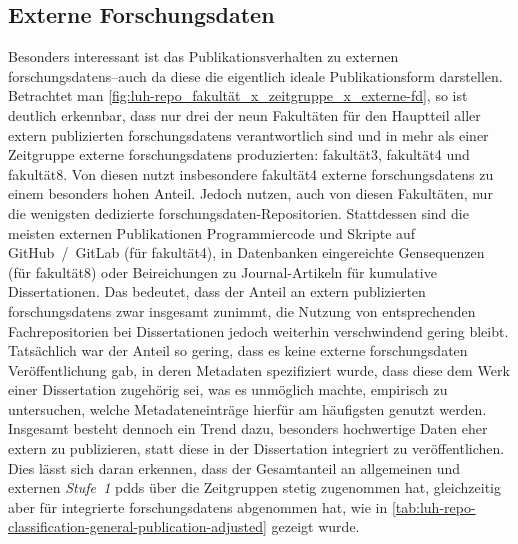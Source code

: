 \subsection{Externe Forschungsdaten}
Besonders interessant ist das Publikationsverhalten zu externen \glspl{forschungsdaten}--auch da diese die eigentlich ideale Publikationsform darstellen.
Betrachtet man \cref{fig:luh-repo_fakultät_x_zeitgruppe_x_externe-fd}, so ist deutlich erkennbar, dass nur drei der neun Fakultäten für den Hauptteil aller extern publizierten \glspl{forschungsdaten} verantwortlich sind und in mehr als einer Zeitgruppe externe \glspl{forschungsdaten} produzierten: \gls{fakultät3}, \gls{fakultät4} und \gls{fakultät8}.
Von diesen nutzt insbesondere \gls{fakultät4} externe \glspl{forschungsdaten} zu einem besonders hohen Anteil.
Jedoch nutzen, auch von diesen Fakultäten, nur die wenigsten dedizierte \gls{forschungsdaten}-Repositorien.
Stattdessen sind die meisten externen Publikationen Programmiercode und Skripte auf GitHub~/~GitLab (für \gls{fakultät4}), in Datenbanken eingereichte Gensequenzen (für \gls{fakultät8}) oder Beireichungen zu Journal-Artikeln für kumulative Dissertationen.
Das bedeutet, dass der Anteil an extern publizierten \glspl{forschungsdaten} zwar insgesamt zunimmt, die Nutzung von entsprechenden Fachrepositorien bei Dissertationen jedoch weiterhin verschwindend gering bleibt.
Tatsächlich war der Anteil so gering, dass es keine externe \gls{forschungsdaten} Veröffentlichung gab, in deren Metadaten spezifiziert wurde, dass diese dem Werk einer Dissertation zugehörig sei, was es unmöglich machte, empirisch zu untersuchen, welche Metadateneinträge hierfür am häufigsten genutzt werden.
Insgesamt besteht dennoch ein Trend dazu, besonders hochwertige Daten eher extern zu publizieren, statt diese in der Dissertation integriert zu veröffentlichen.
Dies lässt sich daran erkennen, dass der Gesamtanteil an allgemeinen und externen \textit{Stufe~1} \glspl{pdd} über die Zeitgruppen stetig zugenommen hat, gleichzeitig aber für integrierte \glspl{forschungsdaten} abgenommen hat, wie in \cref{tab:luh-repo-classification-general-publication-adjusted} gezeigt wurde.

